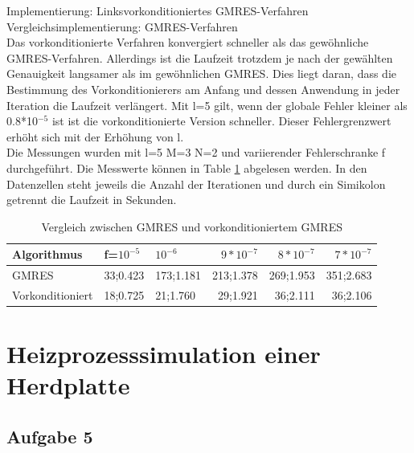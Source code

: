\documentclass{report}
\begin{document}
Implementierung: Linksvorkonditioniertes GMRES-Verfahren\\
Vergleichsimplementierung: GMRES-Verfahren\\
Das vorkonditionierte Verfahren konvergiert schneller als das gewöhnliche GMRES-Verfahren. Allerdings ist die Laufzeit trotzdem je nach der gewählten Genauigkeit langsamer als im gewöhnlichen GMRES. Dies liegt daran, dass die Bestimmung des Vorkonditionierers am Anfang und dessen Anwendung in jeder Iteration die Laufzeit verlängert. Mit l=5 gilt, wenn der globale Fehler kleiner als 0.8*10$^{-5}$ ist ist die vorkonditionierte Version schneller. Dieser Fehlergrenzwert erhöht sich mit der Erhöhung von l.\\
Die Messungen wurden mit l=5 M=3 N=2 und variierender Fehlerschranke f durchgeführt. Die Messwerte können in Table \ref{Table:2_4d} abgelesen werden. In den Datenzellen steht jeweils die Anzahl der Iterationen und durch ein Simikolon getrennt die Laufzeit in Sekunden.\\
\begin{table}
\begin{tabular}{|l|l|l|r|r|r|}
	\hline
	Algorithmus&f=$10^{-5}$ &$10^{-6}$&$9*10^{-7}$& $8*10^{-7}$& $7*10^{-7}$\\
	\hline
	GMRES & 33;0.423 & 173;1.181 & 213;1.378 & 269;1.953 & 351;2.683 \\
	Vorkonditioniert & 18;0.725 & 21;1.760 & 29;1.921 & 36;2.111 & 36;2.106 \\
	\hline
	
\end{tabular}
	\caption{Vergleich zwischen GMRES und vorkonditioniertem GMRES}
	\label{Table:2_4d}
\end{table}
\section{Heizprozesssimulation einer Herdplatte}
\subsection{Aufgabe 5}
\end{document}

